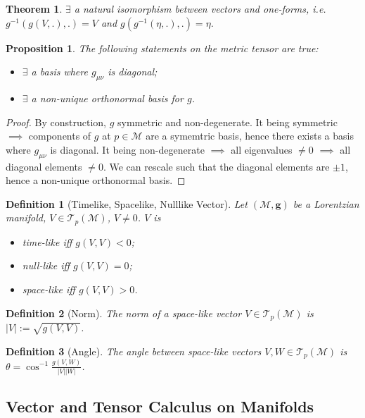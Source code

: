 \documentclass[a4paper]{article}
\theoremstyle{new}
\newtheorem{defi}{Definition}[section]
\newtheorem{thm}{Theorem}[section]
\newtheorem{prop}{Proposition}[section]
\begin{document}
\begin{thm}
$\exists$ a natural isomorphism between vectors and one-forms, i.e. $g^{-1}(g(V,.),.)=V$ and $g(g^{-1}(\eta,.),.)=\eta$.
\end{thm}
\begin{prop}
The following statements on the metric tensor are true:
\begin{itemize}
    \item $\exists$ a basis where $g_{\mu\nu}$ is diagonal;
    \item $\exists$ a non-unique orthonormal basis for $g$.
\end{itemize}
\end{prop}
\begin{proof}
By construction, $g$ symmetric and non-degenerate. It being symmetric $\implies$ components of $g$ at $p\in\mathcal{M}$ are a symemtric basis, hence there exists a basis where $g_{\mu\nu}$ is diagonal. It being non-degenerate $\implies$ all eigenvalues $\neq0$ $\implies$ all diagonal elements $\neq 0$. We can rescale such that the diagonal elements are $\pm1$, hence a non-unique orthonormal basis. 
\end{proof}
\begin{defi}[Timelike, Spacelike, Nulllike Vector]
Let $(\mathcal{M},\mathbf{g})$ be a Lorentzian manifold, $V\in\mathcal{T}_p(\mathcal{M})$, $V\neq0$. $V$ is
\begin{itemize}
    \item time-like iff $g(V,V)<0$;
    \item null-like iff $g(V,V)=0$;
    \item space-like iff
    $g(V,V)>0$.
\end{itemize}
\end{defi}
\begin{defi}[Norm]
The norm of a space-like vector $V\in\mathcal{T}_p(\mathcal{M})$ is $|V|:=\sqrt{g(V,V)}$.
\end{defi}
\begin{defi}[Angle]
The angle between space-like vectors $V,W\in\mathcal{T}_p(\mathcal{M})$ is $\theta=\cos^{-1}\frac{g(V,W)}{|V||W|}$.
\end{defi}
\subsection{Vector and Tensor Calculus on Manifolds}
\end{document}
